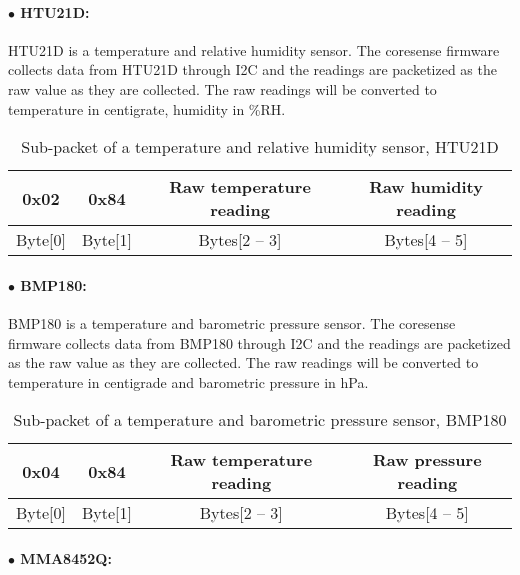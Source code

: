 \paragraph{$\bullet$ HTU21D:}
HTU21D is a temperature and relative humidity sensor.
The coresense firmware collects data from HTU21D through I2C and the readings are packetized as the raw value as they are collected.
The raw readings will be converted to temperature in centigrate, humidity in \%RH.
\\

\begin{table}[h!]
    \centering
    \caption{Sub-packet of a temperature and relative humidity sensor, HTU21D}
    \begin{tabular}{|c|c|c|c|}
        \hline
        \rowcolor{black!8}
        \textbf{0x02} & \textbf{0x84} & \textbf{Raw temperature reading} & \textbf{Raw humidity reading}\\
        \hline
        Byte[0] & Byte[1] & Bytes[2 -- 3] & Bytes[4 -- 5] \\ \hline
    \end{tabular}
\end{table}


\paragraph{$\bullet$ BMP180:}

BMP180 is a temperature and barometric pressure sensor.
The coresense firmware collects data from BMP180 through I2C and the readings are packetized as the raw value as they are collected. 
The raw readings will be converted to temperature in centigrade and barometric pressure in hPa.
\\


\begin{table}[h!]
    \centering
    \caption{Sub-packet of a temperature and barometric pressure sensor, BMP180}
    \begin{tabular}{|c|c|c|c|}
        \hline
        \rowcolor{black!8}
        \textbf{0x04} & \textbf{0x84} & \textbf{Raw temperature reading} & \textbf{Raw pressure reading}\\
        \hline
        Byte[0] & Byte[1] & Bytes[2 -- 3] & Bytes[4 -- 5] \\ \hline
    \end{tabular}
\end{table}

\paragraph{$\bullet$ MMA8452Q:}

